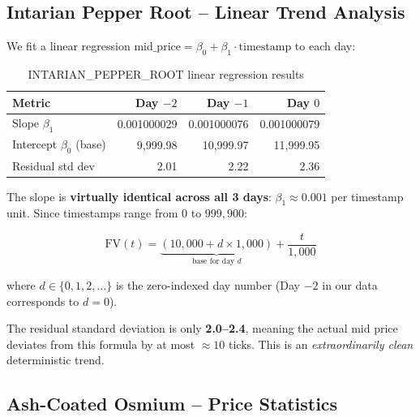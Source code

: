 \documentclass[11pt,a4paper]{article}
\begin{document}
\subsection{Intarian Pepper Root -- Linear Trend Analysis}

We fit a linear regression $\text{mid\_price} = \beta_0 + \beta_1 \cdot \text{timestamp}$ to each day:

\begin{table}[H]
\centering
\caption{INTARIAN\_PEPPER\_ROOT linear regression results}
\begin{tabular}{@{}lrrr@{}}
\toprule
\textbf{Metric} & \textbf{Day $-2$} & \textbf{Day $-1$} & \textbf{Day $0$} \\
\midrule
Slope $\beta_1$             & 0.001000029 & 0.001000076 & 0.001000079 \\
Intercept $\beta_0$ (base)  & 9,999.98    & 10,999.97   & 11,999.95 \\
Residual std dev            & 2.01        & 2.22        & 2.36 \\
\bottomrule
\end{tabular}
\end{table}

The slope is \textbf{virtually identical across all 3 days}: $\beta_1 \approx 0.001$ per timestamp unit. Since timestamps range from $0$ to $999{,}900$:

\begin{equation}
\boxed{\text{FV}(t) = \underbrace{(10{,}000 + d \times 1{,}000)}_{\text{base for day } d} + \frac{t}{1{,}000}}
\end{equation}

where $d \in \{0, 1, 2, \ldots\}$ is the zero-indexed day number (Day $-2$ in our data corresponds to $d = 0$).

The residual standard deviation is only \textbf{2.0--2.4}, meaning the actual mid price deviates from this formula by at most $\approx 10$ ticks. This is an \textit{extraordinarily clean} deterministic trend.

\subsection{Ash-Coated Osmium -- Price Statistics}
\end{document}
